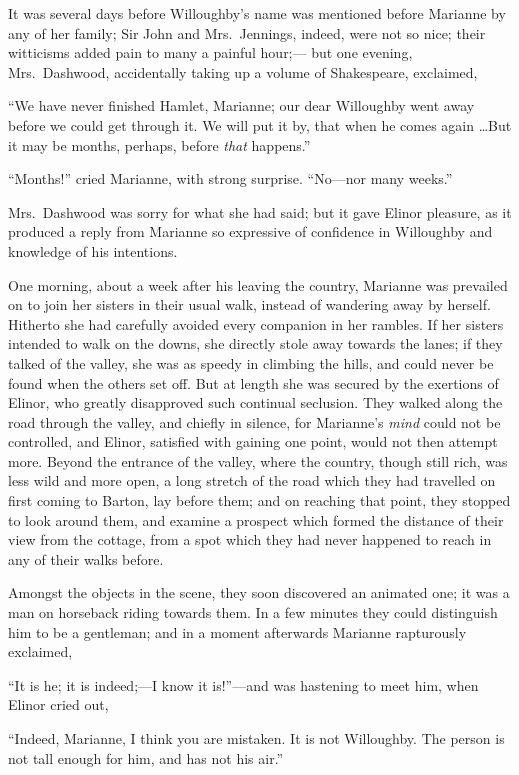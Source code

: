 It was several days before Willoughby's name
was mentioned before Marianne by any of her family;
Sir John and Mrs.\ Jennings, indeed, were not so nice;
their witticisms added pain to many a painful hour;---%
but one evening, Mrs.\ Dashwood, accidentally taking up a
volume of Shakespeare, exclaimed,

``We have never finished Hamlet, Marianne; our dear
Willoughby went away before we could get through it.
We will put it by, that when he comes again \ldots But it may
be months, perhaps, before \emph{that} happens.''

``Months!'' cried Marianne, with strong surprise.
``No---nor many weeks.''

Mrs.\ Dashwood was sorry for what she had said;
but it gave Elinor pleasure, as it produced a reply
from Marianne so expressive of confidence in Willoughby
and knowledge of his intentions.

One morning, about a week after his leaving the country,
Marianne was prevailed on to join her sisters in their
usual walk, instead of wandering away by herself.
Hitherto she had carefully avoided every companion in
her rambles.  If her sisters intended to walk on the downs,
she directly stole away towards the lanes; if they talked
of the valley, she was as speedy in climbing the hills,
and could never be found when the others set off.
But at length she was secured by the exertions of Elinor,
who greatly disapproved such continual seclusion.  They walked
along the road through the valley, and chiefly in silence,
for Marianne's \emph{mind} could not be controlled, and Elinor,
satisfied with gaining one point, would not then attempt more.
Beyond the entrance of the valley, where the country,
though still rich, was less wild and more open, a long
stretch of the road which they had travelled on first coming
to Barton, lay before them; and on reaching that point,
they stopped to look around them, and examine a prospect
which formed the distance of their view from the cottage,
from a spot which they had never happened to reach in any
of their walks before.

Amongst the objects in the scene, they soon discovered
an animated one; it was a man on horseback riding towards them.
In a few minutes they could distinguish him to be a gentleman;
and in a moment afterwards Marianne rapturously exclaimed,

``It is he; it is indeed;---I know it is!''---and was
hastening to meet him, when Elinor cried out,

``Indeed, Marianne, I think you are mistaken.  It is
not Willoughby.  The person is not tall enough for him,
and has not his air.''

